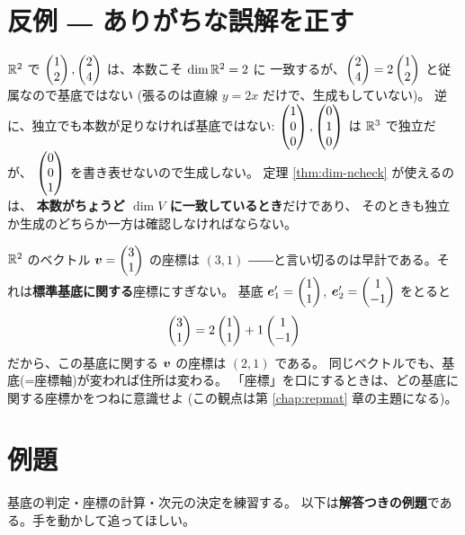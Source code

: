 \section{反例 ― ありがちな誤解を正す}

\begin{hanrei}[本数が合っていても基底とは限らない]\label{hanrei:dim-count}
$\mathbb{R}^2$ で $\begin{pmatrix}1 \\ 2\end{pmatrix}, \begin{pmatrix}2 \\ 4\end{pmatrix}$ は、本数こそ $\dim \mathbb{R}^2 = 2$ に
一致するが、$\begin{pmatrix}2 \\ 4\end{pmatrix} = 2\begin{pmatrix}1 \\ 2\end{pmatrix}$ と従属なので基底ではない
(張るのは直線 $y = 2x$ だけで、生成もしていない)。
逆に、独立でも本数が足りなければ基底ではない:
$\begin{pmatrix}1 \\ 0 \\ 0\end{pmatrix}, \begin{pmatrix}0 \\ 1 \\ 0\end{pmatrix}$ は $\mathbb{R}^3$ で独立だが、
$\begin{pmatrix}0 \\ 0 \\ 1\end{pmatrix}$ を書き表せないので生成しない。
定理 \ref{thm:dim-ncheck} が使えるのは、
\textbf{本数がちょうど $\dim V$ に一致しているとき}だけであり、
そのときも独立か生成のどちらか一方は確認しなければならない。
\end{hanrei}

\begin{hanrei}[「座標」は基底とセットでしか意味をもたない]\label{hanrei:dim-coord}
$\mathbb{R}^2$ のベクトル $\bm{v} = \begin{pmatrix}3 \\ 1\end{pmatrix}$ の座標は $(3, 1)$
――と言い切るのは早計である。それは\textbf{標準基底に関する}座標にすぎない。
基底 $\bm{e}'_1 = \begin{pmatrix}1 \\ 1\end{pmatrix}$, $\bm{e}'_2 = \begin{pmatrix}1 \\ -1\end{pmatrix}$ をとると
\[
\begin{pmatrix}3 \\ 1\end{pmatrix} = 2\begin{pmatrix}1 \\ 1\end{pmatrix} + 1\begin{pmatrix}1 \\ -1\end{pmatrix}
\]
だから、この基底に関する $\bm{v}$ の座標は $(2, 1)$ である。
同じベクトルでも、基底(=座標軸)が変われば住所は変わる。
「座標」を口にするときは、どの基底に関する座標かをつねに意識せよ
(この観点は第 \ref{chap:repmat} 章の主題になる)。
\end{hanrei}

\section{例題}

基底の判定・座標の計算・次元の決定を練習する。
以下は\textbf{解答つきの例題}である。手を動かして追ってほしい。

